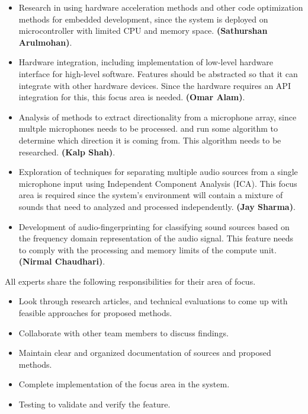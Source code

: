 \documentclass[12pt]{article}
\theoremstyle{definition}
\begin{document}
\begin{itemize}
    \item Research in using hardware acceleration methods and other code
    optimization methods for embedded development, since the system is deployed
    on microcontroller with limited CPU and memory space. \textbf{(Sathurshan
    Arulmohan)}.
    \item Hardware integration, including implementation of low-level hardware
     interface for high-level software. Features should be abstracted so that it
     can integrate with other hardware devices. Since the hardware requires an
     API integration for this, this focus area is needed. \textbf{(Omar Alam)}.
    \item Analysis of methods to extract directionality from a microphone array,
     since multple microphones needs to be processed. and run some algorithm to
     determine which direction it is coming from. This algorithm needs to be
     researched. \textbf{(Kalp Shah)}.
    \item Exploration of techniques for separating multiple audio sources from a
    single microphone input using Independent Component Analysis (ICA). This
    focus area is required since the system's environment will contain a mixture
    of sounds that need to analyzed and processed independently. \textbf{(Jay
    Sharma)}.
    \item Development of audio-fingerprinting for classifying sound sources
    based on the frequency domain representation of the audio signal. This
    feature needs to comply with the processing and memory limits of the compute
    unit.\textbf{(Nirmal Chaudhari)}.
\end{itemize}

\noindent
All experts share the following responsibilities for their area of focus. 

\begin{itemize}
  \item Look through research articles, and technical evaluations to come up
  with feasible approaches for proposed methods. 
  \item Collaborate with other team members to discuss findings. 
  \item Maintain clear and organized documentation of sources and proposed
  methods. 
  \item Complete implementation of the focus area in the system.
  \item Testing to validate and verify the feature.
\end{itemize}
\end{document}
